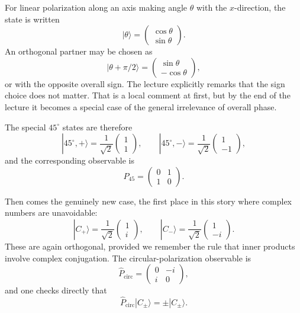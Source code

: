 For linear polarization along an axis making angle $\theta$ with the $x$-direction, the state is written
\begin{equation}
|\theta\rangle=
\begin{pmatrix}
\cos\theta\\
\sin\theta
\end{pmatrix}.
\end{equation}
An orthogonal partner may be chosen as
\begin{equation}
|\theta+\pi/2\rangle=
\begin{pmatrix}
\sin\theta\\
-\cos\theta
\end{pmatrix},
\end{equation}
or with the opposite overall sign. The lecture explicitly remarks that the sign choice does not matter. That is a local comment at first, but by the end of the lecture it becomes a special case of the general irrelevance of overall phase.

The special $45^\circ$ states are therefore
\begin{equation}
|45^\circ,+\rangle=\frac{1}{\sqrt2}
\begin{pmatrix}
1\\
1
\end{pmatrix},
\qquad
|45^\circ,-\rangle=\frac{1}{\sqrt2}
\begin{pmatrix}
1\\
-1
\end{pmatrix},
\end{equation}
and the corresponding observable is
\begin{equation}
\hat P_{45}=
\begin{pmatrix}
0&1\\
1&0
\end{pmatrix}.
\end{equation}

Then comes the genuinely new case, the first place in this story where complex numbers are unavoidable:
\begin{equation}
|C_+\rangle=\frac{1}{\sqrt2}
\begin{pmatrix}
1\\
i
\end{pmatrix},
\qquad
|C_-\rangle=\frac{1}{\sqrt2}
\begin{pmatrix}
1\\
-i
\end{pmatrix}.
\end{equation}
These are again orthogonal, provided we remember the rule that inner products involve complex conjugation. The circular-polarization observable is
\begin{equation}
\hat P_{\mathrm{circ}}=
\begin{pmatrix}
0&-i\\
i&0
\end{pmatrix},
\end{equation}
and one checks directly that
\begin{equation}
\hat P_{\mathrm{circ}}|C_\pm\rangle=\pm |C_\pm\rangle.
\end{equation}

